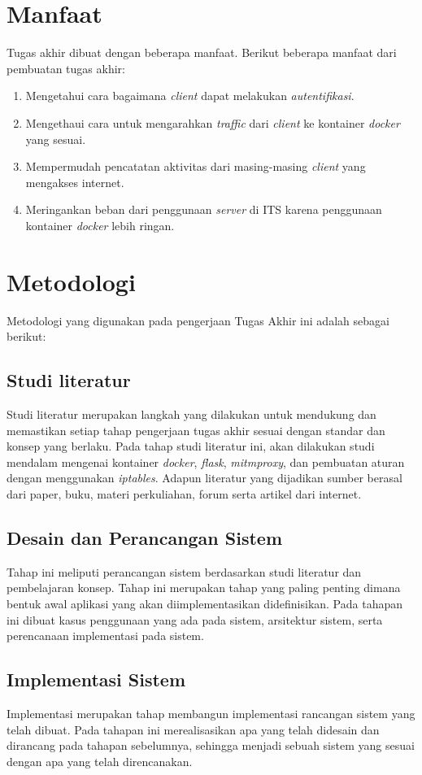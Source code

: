      \section{Manfaat}
	 Tugas akhir dibuat dengan beberapa manfaat. Berikut beberapa manfaat dari pembuatan tugas akhir:
	 \begin{enumerate}
	  \item Mengetahui cara bagaimana \textit{client} dapat melakukan \textit{autentifikasi}.
	  \item Mengethaui cara untuk mengarahkan \textit{traffic} dari \textit{client} ke kontainer \textit{docker} yang sesuai.
	  \item Mempermudah pencatatan aktivitas dari masing-masing \textit{client} yang mengakses internet.
	  \item Meringankan beban dari penggunaan \textit{server} di ITS karena penggunaan kontainer \textit{docker} lebih ringan.
	 \end{enumerate}      
     
     \section{Metodologi}
     Metodologi yang digunakan pada pengerjaan Tugas Akhir ini
adalah sebagai berikut:
     \subsection{Studi literatur}
     Studi literatur merupakan langkah yang dilakukan untuk mendukung dan memastikan setiap tahap pengerjaan tugas akhir sesuai dengan standar dan konsep yang berlaku. Pada tahap studi literatur ini, akan dilakukan studi mendalam mengenai kontainer \textit{docker}, \textit{flask}, \textit{mitmproxy}, dan pembuatan aturan dengan menggunakan \textit{iptables}. Adapun literatur yang dijadikan sumber berasal dari paper, buku, materi perkuliahan, forum serta artikel dari internet.

\subsection{Desain dan Perancangan Sistem}
Tahap ini meliputi perancangan sistem berdasarkan studi literatur dan pembelajaran konsep. Tahap ini merupakan tahap yang paling penting dimana bentuk awal aplikasi yang akan diimplementasikan didefinisikan. Pada tahapan ini dibuat kasus penggunaan yang ada pada sistem, arsitektur sistem, serta perencanaan implementasi pada sistem.
\subsection{Implementasi Sistem}
Implementasi merupakan tahap membangun implementasi rancangan sistem yang telah dibuat. Pada tahapan ini merealisasikan apa yang telah didesain dan dirancang pada tahapan sebelumnya, sehingga menjadi sebuah sistem yang sesuai dengan apa yang telah direncanakan.
